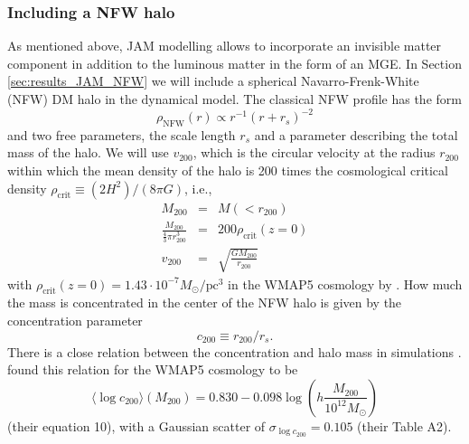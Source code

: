 \documentclass[useAMS,usenatbib]{mnras}
\begin{document}
\subsubsection{Including a NFW halo} \label{sec:model_JAM_NFW}

As mentioned above, JAM modelling allows to incorporate an invisible matter component in addition to the luminous matter in the form of an MGE. In Section \ref{sec:results_JAM_NFW} we will include a spherical Navarro-Frenk-White (NFW) DM halo \citep{1996ApJ...462..563N} in the dynamical model. The classical NFW profile has the form
\begin{equation}
\rho_\text{NFW}(r) \propto r^{-1} \left( r+r_s \right)^{-2} \label{eq:NFWprofile}
\end{equation}
and two free parameters, the scale length $r_s$ and a parameter describing the total mass of the halo. We will use $v_\text{200}$, which is the circular velocity at the radius $r_\text{200}$ within which the mean density of the halo is 200 times the cosmological critical density $\rho_\text{crit} \equiv (2H^2)/(8\pi G)$, i.e.,
\begin{eqnarray*}
M_\text{200} &=& M(<r_{200})\\
\frac{M_{200}}{ \frac 43 \pi r_{200}^3} &=& 200 \rho_\text{crit}(z=0) \\
v_\text{200} &=& \sqrt{\frac{GM_{200}}{r_\text{200}}}
\end{eqnarray*}
with $\rho_\text{crit}(z=0)=1.43 \cdot 10^{-7} M_\odot / \text{pc}^3$ in the WMAP5 cosmology by \citet{WMAP5cosm}. How much the mass is concentrated in the center of the NFW halo is given by the concentration parameter
\begin{equation}
c_{200}\equiv r_{200} / r_s. \label{eq:NFW_c}
\end{equation} 
There is a close relation between the concentration and halo mass in simulations \citep{1996ApJ...462..563N}. \citet{Maccio08} found this relation for the WMAP5 cosmology to be
\begin{equation}
\langle \log c_{200} \rangle (M_{200}) = 0.830 - 0.098 \log \left(h \frac{M_{200}}{10^{12} M_\odot} \right) \label{eq:Maccio08}
\end{equation}
(their equation 10), with a Gaussian scatter of $\sigma_{\log c_{200}} = 0.105$ (their Table A2). 

\end{document}
